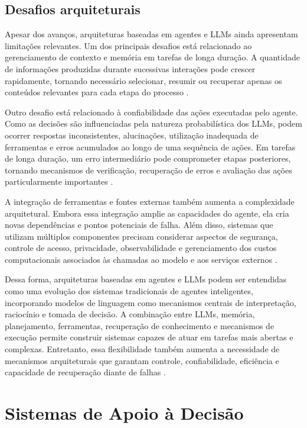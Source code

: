 \subsection{Desafios arquiteturais}

Apesar dos avanços, arquiteturas baseadas em agentes e LLMs ainda apresentam limitações relevantes. Um dos principais desafios está relacionado ao gerenciamento de contexto e memória em tarefas de longa duração. A quantidade de informações produzidas durante sucessivas interações pode crescer rapidamente, tornando necessário selecionar, resumir ou recuperar apenas os conteúdos relevantes para cada etapa do processo \cite{zhao2026survey}.

Outro desafio está relacionado à confiabilidade das ações executadas pelo agente. Como as decisões são influenciadas pela natureza probabilística dos LLMs, podem ocorrer respostas inconsistentes, alucinações, utilização inadequada de ferramentas e erros acumulados ao longo de uma sequência de ações. Em tarefas de longa duração, um erro intermediário pode comprometer etapas posteriores, tornando mecanismos de verificação, recuperação de erros e avaliação das ações particularmente importantes \cite{cheng2026,zhao2026survey}.

A integração de ferramentas e fontes externas também aumenta a complexidade arquitetural. Embora essa integração amplie as capacidades do agente, ela cria novas dependências e pontos potenciais de falha. Além disso, sistemas que utilizam múltiplos componentes precisam considerar aspectos de segurança, controle de acesso, privacidade, observabilidade e gerenciamento dos custos computacionais associados às chamadas ao modelo e aos serviços externos \cite{cheng2026, zhao2026survey}.

Dessa forma, arquiteturas baseadas em agentes e LLMs podem ser entendidas como uma evolução dos sistemas tradicionais de agentes inteligentes, incorporando modelos de linguagem como mecanismos centrais de interpretação, raciocínio e tomada de decisão. A combinação entre LLMs, memória, planejamento, ferramentas, recuperação de conhecimento e mecanismos de execução permite construir sistemas capazes de atuar em tarefas mais abertas e complexas. Entretanto, essa flexibilidade também aumenta a necessidade de mecanismos arquiteturais que garantam controle, confiabilidade, eficiência e capacidade de recuperação diante de falhas \cite{muller1999,cheng2026,zhao2026survey}.


\section{Sistemas de Apoio à Decisão}
\label{sec:sad}

